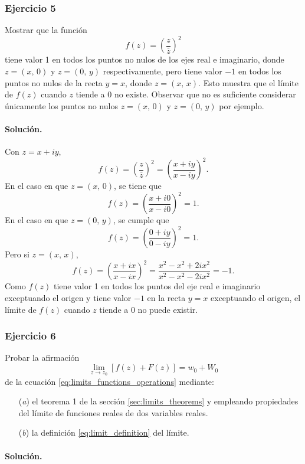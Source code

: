 \documentclass[a4paper]{report}
\begin{document}
\subsubsection{Ejercicio 5}

Mostrar que la función
\[
 f(z)=\left(\frac{z}{\overline{z}}\right)^2
\]
tiene valor 1 en todos los puntos no nulos de los ejes real e imaginario, donde \(z=(x,\,0)\) y \(z=(0,\,y)\) respectivamente, pero tiene valor \(-1\) en todos los puntos no nulos de la recta \(y=x\), donde \(z=(x,\,x)\). Esto muestra que el límite de \(f(z)\) cuando \(z\) tiende a 0 no existe. Observar que no es suficiente considerar únicamente los puntos no nulos \(z=(x,\,0)\) y \(z=(0,\,y)\) por ejemplo.

\paragraph{Solución.} Con \(z=x+iy\),
\[
 f(z)=\left(\frac{z}{\overline{z}}\right)^2=\left(\frac{x+iy}{x-iy}\right)^2.
\]
En el caso en que \(z=(x,\,0)\), se tiene que 
\[
 f(z)=\left(\frac{x+i0}{x-i0}\right)^2=1.
\]
En el caso en que \(z=(0,\,y)\), se cumple que 
\[
 f(z)=\left(\frac{0+iy}{0-iy}\right)^2=1.
\]
Pero si \(z=(x,\,x)\),
\[
 f(z)=\left(\frac{x+ix}{x-ix}\right)^2=\frac{x^2-x^2+2ix^2}{x^2-x^2-2ix^2}=-1.
\]
Como \(f(z)\) tiene valor 1 en todos los puntos del eje real e imaginario exceptuando el origen y tiene valor \(-1\) en la recta \(y=x\) exceptuando el origen, el límite de \(f(z)\) cuando \(z\) tiende a 0 no puede existir.

\subsubsection{Ejercicio 6}

Probar la afirmación
\[
 \lim_{z\to z_0}[f(z)+F(z)]=w_0+W_0
\]
de la ecuación \ref{eq:limits_functions_operations} mediante:
\begin{enumerate}
 \item[(\textit{a})] el teorema 1 de la sección \ref{sec:limits_theorems} y empleando propiedades del límite de funciones reales de dos variables reales.
 \item[(\textit{b})] la definición \ref{eq:limit_definition} del límite.
\end{enumerate}

\paragraph{Solución.} 
\end{document}
